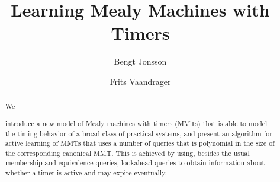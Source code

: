 \documentclass{llncs}
\newif\iflong
\begin{document}
\title{Learning Mealy Machines with Timers}
\author{
Bengt Jonsson 
\and
Frits Vaandrager 
}

\maketitle

\begin{abstract}
\iflong
Active automata learning is emerging as an effective bug finding technique, with applications in areas such as banking cards, network protocols and legacy software. Timing often plays a crucial role in these applications, but cannot be handled by existing learning algorithms. Even though there has been significant progress on algorithms for active learning of timed models, these are not yet broadly applicable due to limited expressiveness and/or high complexity.
In order to address this problem, we 
\else
We
\fi
introduce a new model of Mealy machines with timers (MMTs) that is able to model the timing behavior of a broad class of practical systems, and present an algorithm for active learning of MMTs that uses a
number of queries that is polynomial in the size of the corresponding canonical MMT. This is achieved by using, besides the usual membership and equivalence queries, 
lookahead queries to obtain information about whether a timer is active and may expire eventually.
\end{abstract}




%

%




\end{document}
